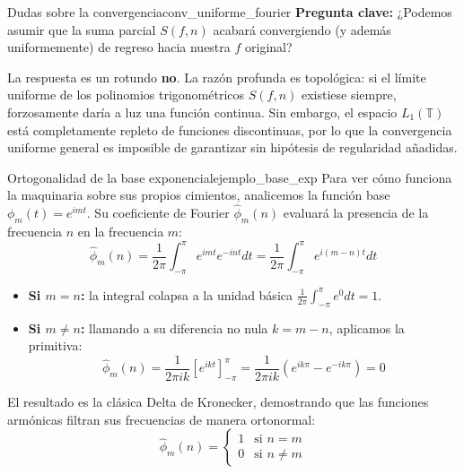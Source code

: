 \begin{observacion}{Dudas sobre la convergencia}{conv_uniforme_fourier}
\textbf{Pregunta clave:} ¿Podemos asumir que la suma parcial $S(f,n)$ acabará convergiendo (y además uniformemente) de regreso hacia nuestra $f$ original? 

La respuesta es un rotundo \textbf{no}. La razón profunda es topológica: si el límite uniforme de los polinomios trigonométricos $S(f,n)$ existiese siempre, forzosamente daría a luz una función continua. Sin embargo, el espacio $L_1(\mathbb{T})$ está completamente repleto de funciones discontinuas, por lo que la convergencia uniforme general es imposible de garantizar sin hipótesis de regularidad añadidas.
\end{observacion}

\begin{ejemplo}{Ortogonalidad de la base exponencial}{ejemplo_base_exp}
Para ver cómo funciona la maquinaria sobre sus propios cimientos, analicemos la función base $\phi_m(t) = e^{imt}$. Su coeficiente de Fourier $\hat{\phi}_m(n)$ evaluará la presencia de la frecuencia $n$ en la frecuencia $m$:
\begin{equation*}
    \hat{\phi}_m(n) = \frac{1}{2\pi} \int_{-\pi}^{\pi} e^{imt} e^{-int} dt = \frac{1}{2\pi} \int_{-\pi}^{\pi} e^{i(m-n)t} dt
\end{equation*}

\begin{itemize}
    \item \textbf{Si $m = n$:} la integral colapsa a la unidad básica $\frac{1}{2\pi} \int_{-\pi}^{\pi} e^0 dt = 1$.
    \item \textbf{Si $m \ne n$:} llamando a su diferencia no nula $k = m-n$, aplicamos la primitiva:
    \begin{equation*}
        \hat{\phi}_m(n) = \frac{1}{2\pi i k} \left[ e^{ikt} \right]_{-\pi}^{\pi} = \frac{1}{2\pi i k} \left( e^{ik\pi} - e^{-ik\pi} \right) = 0
    \end{equation*}
\end{itemize}

El resultado es la clásica Delta de Kronecker, demostrando que las funciones armónicas filtran sus frecuencias de manera ortonormal:
\begin{equation*}
    \hat{\phi}_m(n) = \begin{cases} 
        1 & \text{si } n=m \\ 
        0 & \text{si } n \ne m 
    \end{cases}
\end{equation*}
\end{ejemplo}

